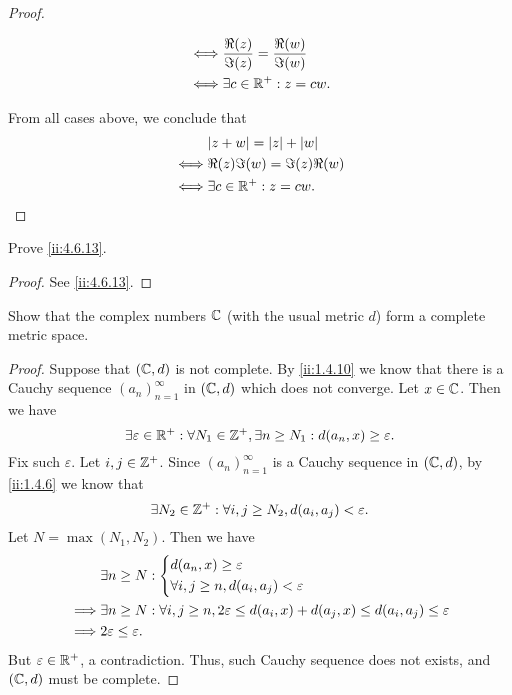 \begin{proof}
\begin{itemize}
\begin{align*}
            \iff & \dfrac{\Re(z)}{\Im(z)} = \dfrac{\Re(w)}{\Im(w)} \\
            \iff & \exists c \in \mathbb{R}^+ : z = cw.
          \end{align*}
  \end{itemize}
  From all cases above, we conclude that
  \begin{align*}
         & \abs{z + w} = \abs{z} + \abs{w} \\
    \iff & \Re(z) \Im(w) = \Im(z) \Re(w)   \\
    \iff & \exists c \in \R^+ : z = cw.
  \end{align*}
\end{proof}

\begin{ex}\label{ii:ex:4.6.9}
  Prove \cref{ii:4.6.13}.
\end{ex}

\begin{proof}
  See \cref{ii:4.6.13}.
\end{proof}

\begin{ex}\label{ii:ex:4.6.10}
  Show that the complex numbers \(\mathbb{C}\) (with the usual metric \(d\)) form a complete metric space.
\end{ex}

\begin{proof}
  Suppose that \((\mathbb{C}, d)\) is not complete.
  By \cref{ii:1.4.10} we know that there is a Cauchy sequence \((a_n)_{n = 1}^\infty\) in \((\mathbb{C}, d)\) which does not converge.
  Let \(x \in \mathbb{C}\).
  Then we have
  \[
    \exists \varepsilon \in \mathbb{R}^+ : \forall N_1 \in \mathbb{Z}^+, \exists n \geq N_1 : d(a_n, x) \geq \varepsilon.
  \]
  Fix such \(\varepsilon\).
  Let \(i, j \in \mathbb{Z}^+\).
  Since \((a_n)_{n = 1}^\infty\) is a Cauchy sequence in \((\mathbb{C}, d)\), by \cref{ii:1.4.6} we know that
  \[
    \exists N_2 \in \mathbb{Z}^+ : \forall i, j \geq N_2, d(a_i, a_j) < \varepsilon.
  \]
  Let \(N = \max(N_1, N_2)\).
  Then we have
  \begin{align*}
             & \exists n \geq N : \begin{dcases}
                                    d(a_n, x) \geq \varepsilon \\
                                    \forall i, j \geq n, d(a_i, a_j) < \varepsilon
                                  \end{dcases}                                                  \\
    \implies & \exists n \geq N : \forall i, j \geq n, 2\varepsilon \leq d(a_i, x) + d(a_j, x) \leq d(a_i, a_j) \leq \varepsilon \\
    \implies & 2\varepsilon \leq \varepsilon.
  \end{align*}
  But \(\varepsilon \in \mathbb{R}^+\), a contradiction.
  Thus, such Cauchy sequence does not exists, and \((\mathbb{C}, d)\) must be complete.
\end{proof}


